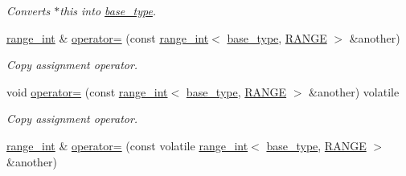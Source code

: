 \begin{DoxyCompactItemize}
\begin{DoxyCompactList}\small\item\em Converts {\itshape $\ast$this} into \mbox{\hyperlink{classfsl_1_1ver__1__0_1_1lg_1_1range__int_aa6c763f6d72d18c8b9129c0c06628cd3}{base\+\_\+type}}. \end{DoxyCompactList}\item 
\mbox{\label{classfsl_1_1ver__1__0_1_1lg_1_1range__int_ad3fb2e453342f0a4022a89d85cb26a79}} 
\mbox{\hyperlink{classfsl_1_1ver__1__0_1_1lg_1_1range__int}{range\+\_\+int}} \& \mbox{\hyperlink{classfsl_1_1ver__1__0_1_1lg_1_1range__int_ad3fb2e453342f0a4022a89d85cb26a79}{operator=}} (const \mbox{\hyperlink{classfsl_1_1ver__1__0_1_1lg_1_1range__int}{range\+\_\+int}}$<$ \mbox{\hyperlink{classfsl_1_1ver__1__0_1_1lg_1_1range__int_aa6c763f6d72d18c8b9129c0c06628cd3}{base\+\_\+type}}, \mbox{\hyperlink{classfsl_1_1ver__1__0_1_1lg_1_1range__int_ae1914aaa2b3bdfc26a9dfd71c73efffd}{R\+A\+N\+GE}} $>$ \&another)
\begin{DoxyCompactList}\small\item\em Copy assignment operator. \end{DoxyCompactList}\item 
\mbox{\label{classfsl_1_1ver__1__0_1_1lg_1_1range__int_a520542447cdcafe83e25b68872674090}} 
void \mbox{\hyperlink{classfsl_1_1ver__1__0_1_1lg_1_1range__int_a520542447cdcafe83e25b68872674090}{operator=}} (const \mbox{\hyperlink{classfsl_1_1ver__1__0_1_1lg_1_1range__int}{range\+\_\+int}}$<$ \mbox{\hyperlink{classfsl_1_1ver__1__0_1_1lg_1_1range__int_aa6c763f6d72d18c8b9129c0c06628cd3}{base\+\_\+type}}, \mbox{\hyperlink{classfsl_1_1ver__1__0_1_1lg_1_1range__int_ae1914aaa2b3bdfc26a9dfd71c73efffd}{R\+A\+N\+GE}} $>$ \&another) volatile
\begin{DoxyCompactList}\small\item\em Copy assignment operator. \end{DoxyCompactList}\item 
\mbox{\label{classfsl_1_1ver__1__0_1_1lg_1_1range__int_af26843bb12a661569e8512c476b03868}} 
\mbox{\hyperlink{classfsl_1_1ver__1__0_1_1lg_1_1range__int}{range\+\_\+int}} \& \mbox{\hyperlink{classfsl_1_1ver__1__0_1_1lg_1_1range__int_af26843bb12a661569e8512c476b03868}{operator=}} (const volatile \mbox{\hyperlink{classfsl_1_1ver__1__0_1_1lg_1_1range__int}{range\+\_\+int}}$<$ \mbox{\hyperlink{classfsl_1_1ver__1__0_1_1lg_1_1range__int_aa6c763f6d72d18c8b9129c0c06628cd3}{base\+\_\+type}}, \mbox{\hyperlink{classfsl_1_1ver__1__0_1_1lg_1_1range__int_ae1914aaa2b3bdfc26a9dfd71c73efffd}{R\+A\+N\+GE}} $>$ \&another)

\end{DoxyCompactItemize}
